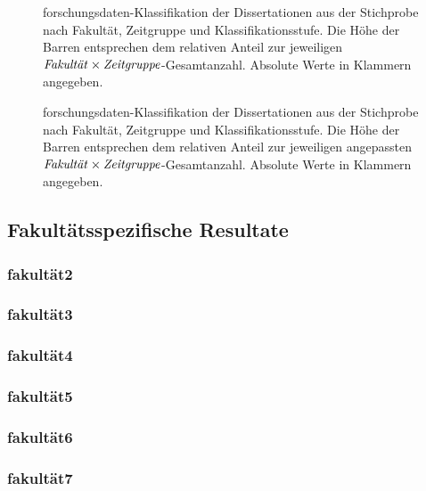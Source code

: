 \begin{figure}[!htbp]
\resizebox{\ifdim\width>\textwidth\textwidth\else\width\fi}{!}{}
\caption{\gls{forschungsdaten}-Klassifikation der Dissertationen aus der Stichprobe nach Fakultät, Zeitgruppe und Klassifikationsstufe.
Die Höhe der Barren entsprechen dem relativen Anteil zur jeweiligen $\text{\textit{Fakultät}}\times\text{\textit{Zeitgruppe}}$-Gesamtanzahl.
Absolute Werte in Klammern angegeben.}
\label{fig:luh-repo-faculty-yeargroup-classification}
\end{figure}
\begin{figure}[!htbp]
    \resizebox{\ifdim\width>\textwidth\textwidth\else\width\fi}{!}{}
    \caption{\gls{forschungsdaten}-Klassifikation der Dissertationen aus der Stichprobe nach Fakultät, Zeitgruppe und Klassifikationsstufe.
    Die Höhe der Barren entsprechen dem relativen Anteil zur jeweiligen angepassten $\text{\textit{Fakultät}}\times\text{\textit{Zeitgruppe}}$-Gesamtanzahl.
    Absolute Werte in Klammern angegeben.}
    \label{fig:luh-repo-faculty-yeargroup-classification-adjusted}
    \end{figure}



\subsection{Fakultätsspezifische Resultate}\label{sec:luh-repo-results-specific}
\subsubsection{\gls{fakultät2}}
\subsubsection{\gls{fakultät3}}
\subsubsection{\gls{fakultät4}}
\subsubsection{\gls{fakultät5}}
\subsubsection{\gls{fakultät6}}
\subsubsection{\gls{fakultät7}}
